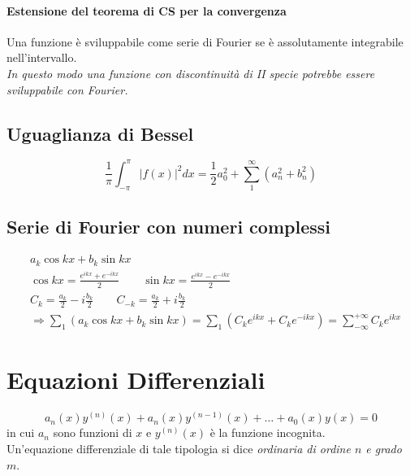 \documentclass[10pt,a4paper,fleqn]{article}
\begin{document}
	\paragraph{Estensione del teorema di CS per la convergenza}
	Una funzione è sviluppabile come serie di Fourier se è assolutamente integrabile nell'intervallo.\\
	\textit{In questo modo una funzione con discontinuità di II specie potrebbe essere sviluppabile con Fourier.}
	
	\subsection{Uguaglianza di Bessel}

	\begin{equation}
		\frac{1}{\pi}\int_{-\pi}^{\pi} \left|f(x)\right|^2dx = \frac{1}{2}a_0^2 + \sum_1^\infty\left(a_n^2 + b_n^2\right)
	\end{equation}

	\subsection{Serie di Fourier con numeri complessi}

	\begin{equation}
		\begin{aligned}
			&a_k\cos kx + b_k\sin kx\\
			&\cos kx = \frac{e^{ikx}+e^{-ikx}}{2} \qquad
			\sin kx = \frac{e^{ikx}-e^{-ikx}}{2}\\
			&C_k = \frac{a_k}{2} - i\frac{b_k}{2} \qquad
			C_{-k} = \frac{a_k}{2} + i\frac{b_k}{2}\\
			&\Longrightarrow \sum_1\left(a_k \cos kx + b_k \sin kx\right) = \sum_1\left(C_k e^{ikx} + C_k e^{-ikx}\right) = \sum_{-\infty}^{+\infty} C_k e^{ikx}
		\end{aligned}
	\end{equation}
	\section{Equazioni Differenziali}
	\begin{equation}
		a_n(x)y^{(n)}(x) + a_n(x)y^{(n-1)}(x) +\dots+a_0(x)y(x)=0
	\end{equation}
	in cui $a_n$ sono funzioni di $x$ e $y^{(n)}(x)$ è la funzione incognita.\\
	Un'equazione differenziale di tale tipologia si dice \emph{ordinaria di ordine $n$ e grado $m$}.
\end{document}

